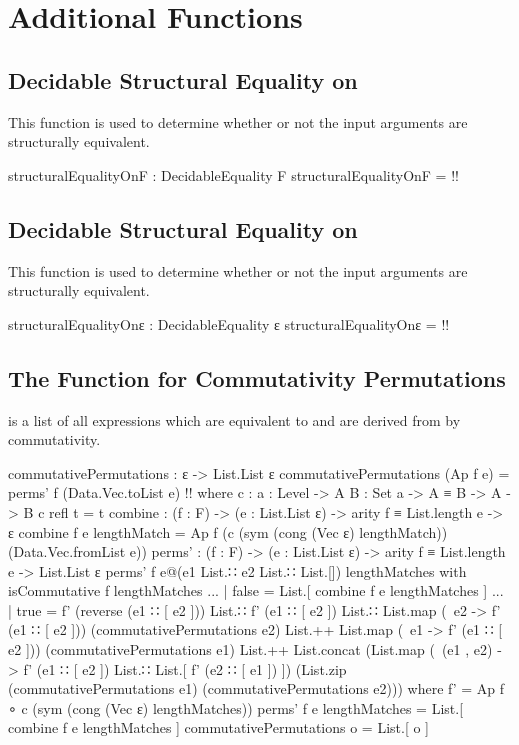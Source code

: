 \documentclass{report}
\begin{document}
\section{Additional Functions}

\subsection{Decidable Structural Equality on }
This function is used to determine whether or not the input arguments are structurally equivalent.

\begin{code}
structuralEqualityOnF : DecidableEquality F
structuralEqualityOnF = {!!}
\end{code}

\subsection{Decidable Structural Equality on }
This function is used to determine whether or not the input arguments are structurally equivalent.

\begin{code}
structuralEqualityOnε : DecidableEquality ε
structuralEqualityOnε = {!!}
\end{code}

\subsection{The Function for Commutativity Permutations}
  is a list of all expressions which are equivalent to  and are derived from  by commutativity.

\begin{code}
commutativePermutations : ε -> List.List ε
commutativePermutations (Ap f e) = perms' f (Data.Vec.toList e) {!!}
  where
  c : {a : Level} ->
      {A B : Set a} ->
      A ≡ B ->
      A -> B
  c refl t = t
  combine : (f : F) -> (e : List.List ε) -> arity f ≡ List.length e -> ε
  combine f e lengthMatch = Ap f (c (sym (cong (Vec ε) lengthMatch))
                                    (Data.Vec.fromList e))
  perms' : (f : F) -> (e : List.List ε) -> arity f ≡ List.length e -> List.List ε
  perms' f e@(e1 List.∷ e2 List.∷ List.[]) lengthMatches with isCommutative f lengthMatches
  ... | false = List.[ combine f e lengthMatches ]
  ... | true =
    f' (reverse (e1 ∷ [ e2 ])) List.∷ f' (e1 ∷ [ e2 ]) List.∷
    List.map (\ e2 -> f' (e1 ∷ [ e2 ])) (commutativePermutations e2) List.++
    List.map (\ e1 -> f' (e1 ∷ [ e2 ])) (commutativePermutations e1) List.++
    List.concat (List.map (\ (e1 , e2) -> f' (e1 ∷ [ e2 ]) List.∷
                                          List.[ f' (e2 ∷ [ e1 ]) ])
                          (List.zip (commutativePermutations e1)
                                    (commutativePermutations e2)))
    where
    f' = Ap f ∘ c (sym (cong (Vec ε) lengthMatches))
  perms' f e lengthMatches = List.[ combine f e lengthMatches ]
commutativePermutations o = List.[ o ]
\end{code}
\end{document}
